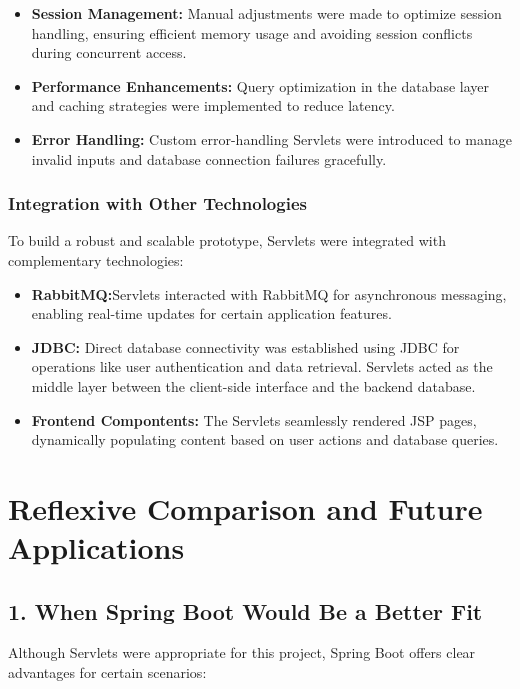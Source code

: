 \begin{itemize}
    \item \textbf{Session Management:} Manual adjustments were made to optimize session handling, ensuring efficient memory usage and avoiding session conflicts during concurrent access.
    \item \textbf{Performance Enhancements:} Query optimization in the database layer and caching strategies were implemented to reduce latency.
    \item \textbf{Error Handling:} Custom error-handling Servlets were introduced to manage invalid inputs and database connection failures gracefully.
\end{itemize}

\subsubsection{Integration with Other Technologies}
To build a robust and scalable prototype, Servlets were integrated with complementary technologies:

\begin{itemize}
    \item \textbf{RabbitMQ:}Servlets interacted with RabbitMQ for asynchronous messaging, enabling real-time updates for certain application features.
    \item \textbf{JDBC:} Direct database connectivity was established using JDBC for operations like user authentication and data retrieval. Servlets acted as the middle layer between the client-side interface and the backend database.
    \item \textbf{Frontend Compontents:} The Servlets seamlessly rendered JSP pages, dynamically populating content based on user actions and database queries.
\end{itemize}

\section{Reflexive Comparison and Future Applications}

\subsection{1. When Spring Boot Would Be a Better Fit}

Although Servlets were appropriate for this project, Spring Boot offers clear advantages for certain scenarios:

